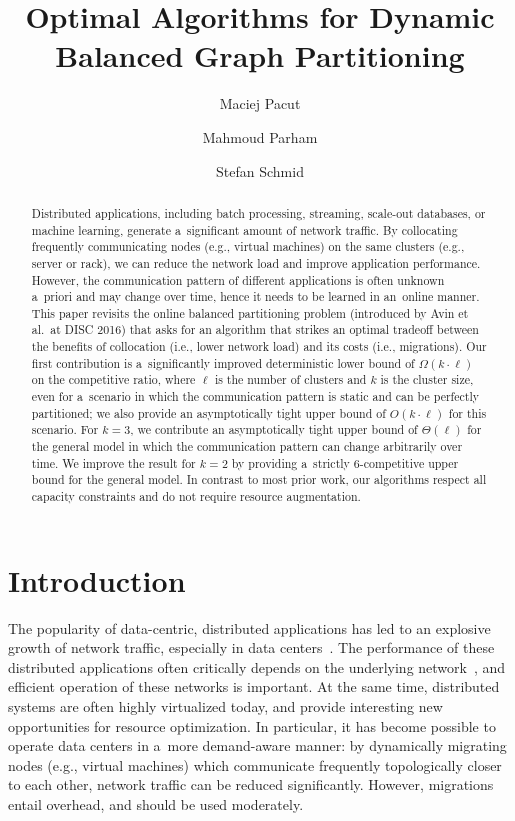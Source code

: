 \documentclass[a4paper,anonymous,USenglish]{lipics-v2019}
\title{Optimal Algorithms for Dynamic Balanced Graph Partitioning}
\author{Maciej Pacut}{maciej.pacut@univie.ac.at}{Faculty of Computer Science, University of Vienna,Austria}{0000-0002-6379-1490}{}
\author{Mahmoud Parham}{mahmoud.parham@univie.ac.at}{Faculty of Computer Science, University of Vienna, Austria}{0000-0002-6211-077X}{}
\author{Stefan Schmid}{stefan\_schmid@univie.ac.at}{Faculty of Computer Science, University of Vienna, Austria}{}{}
\begin{document}
\maketitle


\begin{abstract}
	Distributed   applications,  including  batch  processing, streaming, scale-out databases,
	or machine learning, generate a~significant amount of network traffic.
	By collocating frequently communicating nodes (e.g., virtual machines) on the same clusters (e.g., server or rack), we can reduce the network load and  improve application performance. 
	However, the communication pattern of different applications is often unknown a~priori and may change over time, hence it needs to be learned in an~online manner.
	This paper revisits the online 
	balanced partitioning problem 
	(introduced by Avin et al.~at DISC 2016)
	that asks for an algorithm that strikes
	an optimal tradeoff between the benefits
	of collocation (i.e., lower network load) 
	and its costs (i.e., migrations). 
	Our first contribution is a~significantly improved deterministic
	lower bound of $\Omega(k\cdot \ell)$ on the
	competitive ratio, where $\ell$ is the number
	of clusters and $k$ is the cluster size,
	even for a~scenario in which the communication
	pattern is static and can be perfectly partitioned;
	we also provide an asymptotically tight upper bound 
	of $O(k\cdot \ell)$ for this scenario.
	For $k=3$, we contribute an asymptotically tight upper bound
	of $\Theta(\ell)$
	for the general model in which the
	communication pattern can change arbitrarily over time.
	We improve the result for $k=2$ by providing a~strictly $6$-competitive upper bound for the general model.
	In contrast to most prior work, our algorithms respect all capacity constraints and do not require resource augmentation.
	
\end{abstract}




\section{Introduction}

The popularity of data-centric, distributed applications has led to an explosive growth of network traffic, especially in data centers~\cite{roy2015inside,singh2015jupiter}.
The performance of these distributed applications often critically depends on the underlying network~\cite{mogul2012we}, and efficient operation of these networks is important.
At the same time, distributed systems are often highly virtualized today, and provide interesting new opportunities for resource optimization.
In particular, it has become possible to operate data centers in a~more demand-aware manner: 
by dynamically migrating nodes (e.g., virtual machines) which communicate frequently topologically closer to each other, network traffic can be reduced significantly.  
However, migrations entail overhead, and should be used moderately. 
\end{document}

